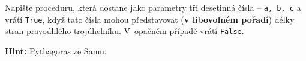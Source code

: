 \question[50]
Napište proceduru, která dostane jako parametry tři desetinná čísla -- \texttt{a, b, c} a
vrátí \texttt{True}, když tato čísla mohou představovat (\textbf{v libovolném
pořadí}) délky stran pravoúhlého trojúhelníku. V~opačném případě vrátí
\texttt{False}.

\textbf{Hint:} Pythagoras ze Samu.